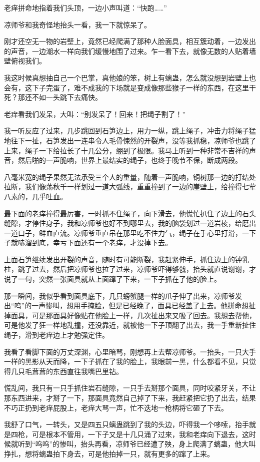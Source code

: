 老痒拼命地指着我们头顶，一边小声叫道：“快跑……”

凉师爷和我奇怪地抬头一看，我一下就惊呆了。

刚才还空无一物的岩壁上，竟然已经爬满了那种人脸面具，相互簇动着，一边发出的声音，一边潮水一样向我们缓慢地围了过来。乍一看下去，就像无数的人贴着墙壁俯视我们。

我这时候真想抽自己一个巴掌，真他娘的笨，树上有螭蛊，怎么就没想到岩壁上也会有，这下子完蛋了，难不成我的下场就是变成像那些猴子一样的东西，在这里干死？那还不如一头跳下去痛快。

老痒看我们发呆，大叫：“别发呆了！回来！把绳子割了！”

我一听反应了过来，几步跳回到石笋边上，用力一纵，跳上绳子，冲击力将绳子猛地往下一扯，石笋发出一连串令人毛骨悚然的开裂声，没等我抓稳，凉师爷也跳了上来，绳子一下给拉长了十几公分，绷到了极限。我马上听到一种非常不吉祥的声音，然后啪的一声脆响，世界上最结实的绳子，也终于晚节不保，断成两段。

八毫米宽的绳子果然无法承受三个人的重量，随着一声脆响，铜树那一边的打结处拉断，我们像荡秋千一样划过一道大弧线，重重撞到了一边的崖壁上，给撞得七荤八素的，几乎吐血。

最下面的老痒撞得最厉害，一时抓不住绳子，向下滑去，他慌忙扒住了边上的石头缝隙，才停住身子，我和凉师爷也好不到哪里去，我的脑袋划过一道岩棱，给磨出一道口子，鲜血直流。凉师爷垂直吊在那里吃不住力气，绳子在手心里打滑，一下子就哧溜到底，幸亏下面还有一个老痒，才没掉下去。

上面石笋继续发出开裂的声音，随时有可能断裂，我赶紧伸手，抓住边上的钟乳柱，跳了过去，然后把凉师爷也拉了过来，凉师爷吓得够戗，抬头就直说谢谢，才说了一句，突然一张面具就从上面蹿了下来，一下子抓在了他的脸上。

那一瞬间，我似乎看到面具底下，几只螃蟹腿一样的爪子伸了出来，凉师爷发出“呜”的一声惨叫，想用手掩脸，但是已经晚了，面具已经盖了上去。他拼命想扯掉面具，可是那面具好像贴在他脸上一样，几次扯出来又吸了回去。我想去帮他，可是他发了狂一样地乱撞，还没靠近，就被他一下子顶翻了出去，我一手重新扯住绳子，滑到老痒边上才勉强定住。

我看了看脚下面的万丈深渊，心里暗骂，刚想再上去帮凉师爷。一抬头，一只大手一样的黑影从天而降，一下子抓在了我的脸上，我眼前一黑，什么都看不见，只觉得几只毛茸茸的东西直往我嘴巴里钻。

慌乱间，我只有一只手抓住岩石缝隙，一只手去掰那个面具，同时咬紧牙关，不让那东西进来，才掰了一下，那面具竟然自己掉了下来，我赶紧把它扔了出去，结果不巧正扔到老痒屁股上，老痒大骂一声，忙不迭地一枪柄将它砸了下去。

我舒了口气，一转头，又是四五只螭蛊跳到了我的头边，吓得我一个哆嗦，抬手就是四枪，可是根本不管用，一下子又是十几只涌了过来，我和老痒向下退去，这时候就听到“呜呜”的惨叫，抬头再看，凉师爷已经遭了殃，身上爬满了螭蛊，他大叫挣扎，想将螭蛊拍下身去，可是他拍掉一只，就有更多的蹿了上来。

